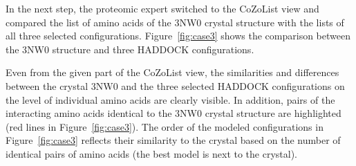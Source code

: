 \documentclass{bmcart}
\begin{document}

In the next step, the proteomic expert switched to the CoZoList view and compared the list of amino acids of the 3NW0 crystal structure with the lists of all three selected configurations.
Figure~\ref{fig:case3} shows the comparison between the 3NW0 structure and three HADDOCK configurations.

Even from the given part of the CoZoList view, the similarities and differences between the crystal 3NW0 and the three selected HADDOCK configurations on the level of individual amino acids are clearly visible.
In addition, pairs of the interacting amino acids identical to the 3NW0 crystal structure are highlighted (red lines in Figure~\ref{fig:case3}). The order of the modeled configurations in Figure~\ref{fig:case3} reflects their similarity to the crystal based on the number of identical pairs of amino acids (the best model is next to the crystal).


\end{document}
